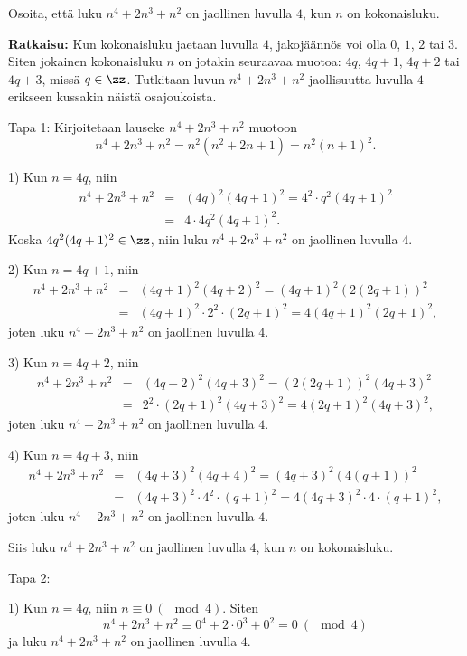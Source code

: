 \begin{esimerkki}
Osoita, että luku $n^4 + 2n^3 + n^2$ on
jaollinen luvulla $4$, kun $n$ on kokonaisluku.

{\bf Ratkaisu:}
Kun kokonaisluku jaetaan luvulla $4$, jakojäännös voi olla $0$,
$1$, $2$ tai $3$. Siten jokainen kokonaisluku $n$ on jotakin
seuraavaa muotoa: $4q$, $4q + 1$, $4q + 2$ tai $4q + 3$, missä
$q\in\zz$. Tutkitaan luvun $n^4 + 2n^3 + n^2$ jaollisuutta luvulla
$4$ erikseen kussakin näistä osajoukoista.

Tapa 1: Kirjoitetaan lauseke $n^4 + 2n^3 + n^2$ muotoon
\[
n^4 + 2n^3 + n^2 = n^2 (n^2 + 2n + 1) = n^2 (n + 1)^2.
\]

1) Kun $n = 4q$, niin
\begin{eqnarray*}
n^4 + 2n^3 + n^2 &=& (4q)^2(4q + 1)^2 = 4^2 \cdot q^2 (4q + 1)
^2\\
&=& 4 \cdot 4q^2 (4q + 1)^2.
\end{eqnarray*}
Koska $4q^2 (4q + 1)^2 \in \zz$, niin luku $n^4 + 2n^3 + n^2$ on jaollinen luvulla $4$.

2) Kun $n = 4q + 1$, niin
\begin{eqnarray*}
n^4 + 2n^3 + n^2 &=& (4q+1)^2(4q + 2)^2 = (4q+1)^2 (2(2q + 1))
^2\\
&=& (4q+1)^2 \cdot 2^2 \cdot (2q + 1)^2 = 4(4q+1)^2 (2q + 1)^2,
\end{eqnarray*}
joten luku $n^4 + 2n^3 + n^2$ on jaollinen luvulla $4$.

3) Kun $n = 4q + 2$, niin
\begin{eqnarray*}
n^4 + 2n^3 + n^2 &=& (4q+2)^2(4q + 3)^2 = (2(2q+1))^2 (4q + 3)
^2\\
&=& 2^2 \cdot (2q+1)^2 (4q + 3)^2 = 4(2q+1)^2 (4q + 3)^2,
\end{eqnarray*}
joten luku $n^4 + 2n^3 + n^2$ on jaollinen luvulla $4$.

4) Kun $n = 4q + 3$, niin
\begin{eqnarray*}
n^4 + 2n^3 + n^2 &=& (4q+3)^2(4q + 4)^2 = (4q+3)^2 (4(q + 1))^2\\
&=& (4q+3)^2 \cdot 4^2 \cdot (q + 1)^2 = 4(4q+3)^2 \cdot 4 \cdot
(q + 1)^2,
\end{eqnarray*}
joten luku $n^4 + 2n^3 + n^2$ on jaollinen luvulla $4$.

Siis luku $n^4 + 2n^3 + n^2$ on jaollinen luvulla $4$, kun $n$ on
kokonaisluku.

Tapa 2:

1) Kun $n = 4q$, niin $n\equiv0\ (\mod 4)$. Siten
\[
n^4 + 2n^3 + n^2 \equiv 0^4 + 2 \cdot 0^3 + 0^2 = 0\ (\mod 4)
\]
ja luku $n^4 + 2n^3 + n^2$ on jaollinen luvulla $4$.


\end{esimerkki}
